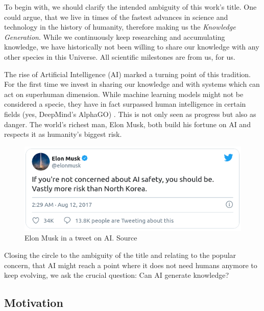 

To begin with, we should clarify the intended ambiguity of this work's title. One could argue, that we live in times of the fastest advances in science and technology in the history of humanity, therefore making us the \textit{Knowledge Generation}. While we continuously keep researching and accumulating knowledge, we have historically not been willing to share our knowledge with any other species in this Universe. All scientific milestones are from us, for us. 

The rise of Artificial Intelligence (AI) marked a turning point of this tradition. For the first time we invest in sharing our knowledge and with systems which can act on superhuman dimension. While machine learning models might not be considered a specie, they have in fact surpassed human intelligence in certain fields (yes, DeepMind's AlphaGO) \cite{silver_mastering_2017}. This is not only seen as progress but also as danger. The world's richest man, Elon Musk, both build his fortune on AI and respects it as humanity's biggest risk. 

\begin{figure}[H]
    \centering
    \includegraphics[height=.21\textwidth, keepaspectratio]{data/images/ElonMusk.png}
    \caption{Elon Musk in a tweet on AI. Source \cite{noauthor_elon_nodate}}
    \label{fig1:Elon}
\end{figure}


%     


Closing the circle to the ambiguity of the title and relating to the popular concern, that AI might reach a point where it does not need humans anymore to keep evolving, we ask the crucial question: Can AI generate knowledge? 


\subsection{Motivation}

